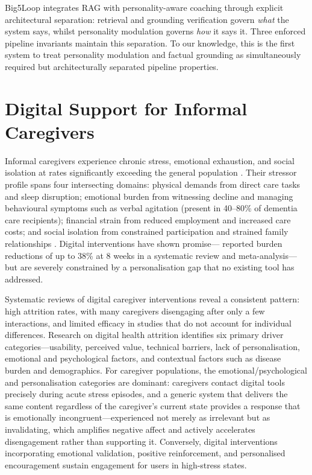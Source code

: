 \documentclass[10pt,a4paper]{report}
\begin{document}
Big5Loop integrates RAG with personality-aware coaching through explicit architectural separation: retrieval and grounding verification govern \emph{what} the system says, whilst personality modulation governs \emph{how} it says it. Three enforced pipeline invariants maintain this separation. To our knowledge, this is the first system to treat personality modulation and factual grounding as simultaneously required but architecturally separated pipeline properties.

\section{Digital Support for Informal Caregivers}

Informal caregivers experience chronic stress, emotional exhaustion, and social isolation at rates significantly exceeding the general population \citep{Schulz2008, Pinquart2003}. Their stressor profile spans four intersecting domains: physical demands from direct care tasks and sleep disruption; emotional burden from witnessing decline and managing behavioural symptoms such as verbal agitation (present in 40--80\% of dementia care recipients); financial strain from reduced employment and increased care costs; and social isolation from constrained participation and strained family relationships \citep{Brodaty2009}. Digital interventions have shown promise---\citet{Mooney2024} reported burden reductions of up to 38\% at 8 weeks in a systematic review and meta-analysis---but are severely constrained by a personalisation gap that no existing tool has addressed.

Systematic reviews of digital caregiver interventions reveal a consistent pattern: high attrition rates, with many caregivers disengaging after only a few interactions, and limited efficacy in studies that do not account for individual differences. Research on digital health attrition identifies six primary driver categories---usability, perceived value, technical barriers, lack of personalisation, emotional and psychological factors, and contextual factors such as disease burden and demographics. For caregiver populations, the emotional/psychological and personalisation categories are dominant: caregivers contact digital tools precisely during acute stress episodes, and a generic system that delivers the same content regardless of the caregiver's current state provides a response that is emotionally incongruent---experienced not merely as irrelevant but as invalidating, which amplifies negative affect and actively accelerates disengagement rather than supporting it. Conversely, digital interventions incorporating emotional validation, positive reinforcement, and personalised encouragement sustain engagement for users in high-stress states.
\end{document}
